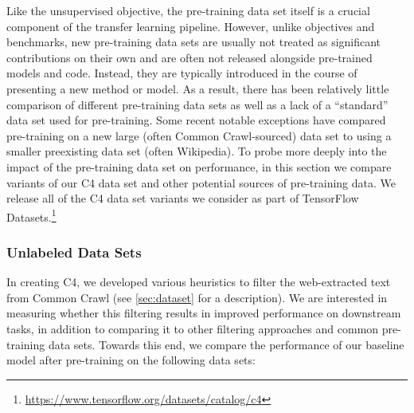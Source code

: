 \documentclass[twoside,11pt]{article}
\begin{document}
Like the unsupervised objective, the pre-training data set itself is a crucial component of the transfer learning pipeline.
However, unlike objectives and benchmarks, new pre-training data sets are usually not treated as significant contributions on their own and are often not released alongside pre-trained models and code.
Instead, they are typically introduced in the course of presenting a new method or model.
As a result, there has been relatively little comparison of different pre-training data sets as well as a lack of a ``standard'' data set used for pre-training.
Some recent notable exceptions \citep{baevski2019cloze,liu2019roberta,yang2019xlnet} have compared pre-training on a new large (often Common Crawl-sourced) data set to using a smaller preexisting data set (often Wikipedia).
To probe more deeply into the impact of the pre-training data set on performance, in this section we compare variants of our C4 data set and other potential sources of pre-training data.
We release all of the C4 data set variants we consider as part of TensorFlow Datasets.\footnote{\url{https://www.tensorflow.org/datasets/catalog/c4}}

\subsubsection{Unlabeled Data Sets}
\label{sec:datasets_comparison}

In creating C4, we developed various heuristics to filter the web-extracted text from Common Crawl (see \cref{sec:dataset} for a description).
We are interested in measuring whether this filtering results in improved performance on downstream tasks, in addition to comparing it to other filtering approaches and common pre-training data sets.
Towards this end, we compare the performance of our baseline model after pre-training on the following data sets:
\end{document}
